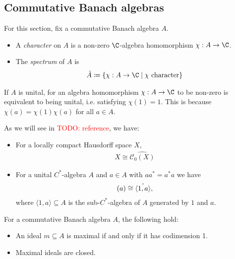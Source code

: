 \documentclass[american]{scrartcl}
\newcommand{\todo}[1]{\textcolor{red}{TODO: #1}}
\newcommand{\cC}{\mathcal{C}}
\let\sp\relax
\begin{document}
	\subsection{Commutative Banach algebras}
	For this section, fix a commutative Banach algebra $A$.
	\begin{definition}
		\leavevmode
		\begin{itemize}
			\item A \textit{character} on $A$ is a non-zero $\C$-algebra homomorphism $\chi:A\to\C$.
			\item The \textit{spectrum} of $A$ is
			\begin{align*}
				\hat{A}\coloneqq \left\{\chi:A\to \C\mid\chi\text{ character}\right\}
			\end{align*}
		\end{itemize}
	\end{definition}
	\begin{remark}\label{Rmk: Characters unital}
		If $A$ is unital, for an algebra homomorphism $\chi:A\to\C$ to be non-zero is equivalent to being unital, i.e. satisfying $\chi(1)=1$. This is because $\chi(a)=\chi(1)\chi(a)$ for all $a\in A$.
	\end{remark}
	\begin{example}
		As we will see in \todo{reference}, we have:
		\begin{itemize}
			\item For a locally compact Hausdorff space $X$,
			\begin{align*}
				X\cong \hat{\cC_0(X)}
			\end{align*}
			\item For a unital $C^*$-algebra $A$ and $a\in A$ with $aa^*=a^*a$ we have
			\begin{align*}
				\sp(a)\cong \hat{\langle 1,a\rangle},
			\end{align*}
			where $\langle 1,a\rangle\subseteq A$ is the sub-$C^*$-algebra of $A$ generated by $1$ and $a$.
		\end{itemize}
	\end{example}
	\begin{fact}\label{Fact: Maximal ideals in commutative Banach algebra}
		For a commutative Banach algebra $A$, the following hold:
		\begin{itemize}
			\item An ideal $m\subseteq A$ is maximal if and only if it has codimension 1.
			\item Maximal ideals are closed.
		\end{itemize}
	\end{fact}
\end{document}
